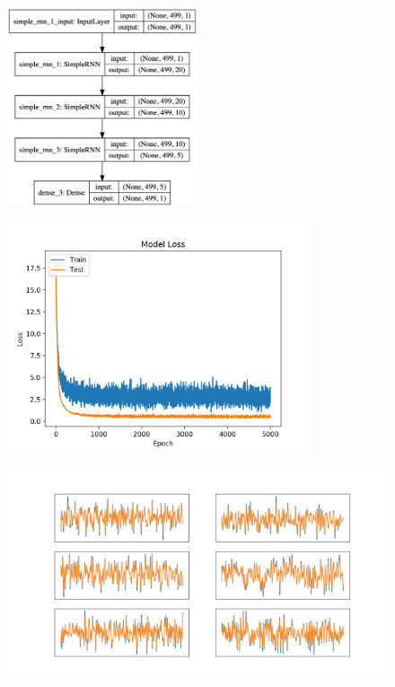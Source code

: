 \documentclass[12pt]{article}
\begin{document}
\begin{figure}[h] 
\centering
\includegraphics[width=0.5\textwidth]{rnn_model.png}
\caption{}
\end{figure}


\begin{figure}[h] 
\centering
\includegraphics[width=0.8\textwidth]{loss.png}
\caption{}
\end{figure}


\begin{figure}[h] 
\includegraphics[width=1.05\textwidth]{fit.png}
\caption{}
\end{figure}
\end{document}

